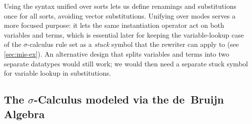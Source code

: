 \documentclass[a4paper,UKenglish,cleveref, autoref, thm-restate,anonymous]{lipics-v2021}
\begin{document}
Using the syntax unified over sorts lets us define renamings and substitutions
once for all sorts, avoiding vector substitutions. Unifying over modes serves
a more focused purpose: it lets the same instantiation operator
 act on both variables and terms, which is essential
later for keeping the variable-lookup case of the $σ$-calculus rule set as a
\emph{stuck} symbol that the rewriter can apply to (see \cref{sec:mis-ex}). An
alternative design that splits variables and terms into two separate datatypes
would still work; we would then need a separate stuck symbol for variable
lookup in substitutions.

\subsection{The $σ$-Calculus modeled via the de~Bruijn Algebra}\label{sec:pre-sig}
\end{document}
